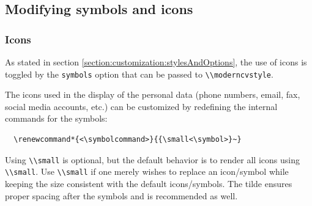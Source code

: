\documentclass[a4paper, 11pt]{article}
\newcommand{\code}[1]{\lstinline!#1!}
\begin{document}
\subsection{Modifying symbols and icons}
\subsubsection{Icons}
As stated in section \ref{section:customization:stylesAndOptions}, the use of icons is toggled by the \code{symbols} option that can be passed to \code{\\moderncvstyle}.

The icons used in the display of the personal data (phone numbers, email, fax, social media accounts, etc.) can be customized by redefining the internal commands for the symbols:
\begin{lstlisting}
  \renewcommand*{<\symbolcommand>}{{\small<\symbol>}~}
\end{lstlisting}
Using \code{\\small} is optional, but the default behavior is to render all icons using \code{\\small}.
Use \code{\\small} if one merely wishes to replace an icon/symbol while keeping the size consistent with the default icons/symbols.
The tilde ensures proper spacing after the symbols and is recommended as well.
\end{document}
